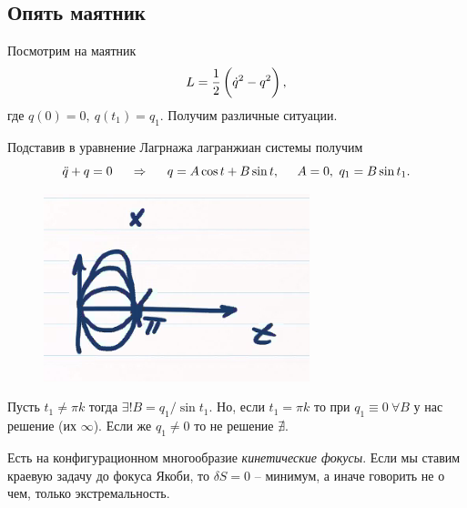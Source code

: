 \subsection{Опять маятник}



Посмотрим на маятник
\begin{equation*}
    L = \frac{1}{2} \left(\vphantom{\frac{1}{2}} \dot{q}^2 - q^2 \right),
\end{equation*}
где $q(0)=0, \ q(t_1)=q_1$. Получим различные ситуации. 

Подставив в уравнение Лагрнажа лагранжиан системы получим
\begin{equation*}
    \ddot{q} + q = 0
    \hspace{0.5cm} \Rightarrow \hspace{0.5cm} 
    q = A \cos t + B \sin t,
    \hspace{0.5cm} A = 0, \ q_1 = B \sin t_1.
\end{equation*}

\begin{figure}
  \begin{center}
        \vspace{-5 mm}
        \includegraphics[width=0.8\linewidth]{figures/1.png}
  \end{center}
\end{figure}


\noindent
Пусть $t_1 \neq \pi k $ тогда $\exists ! B = q_1 / \sin t_1$. Но, если $t_1 = \pi k$ то при $q_1 \equiv 0 \ \forall B$ у нас решение (их $\infty$). Если же $q_1 \neq 0$ то не решение $\nexists$. 


\begin{to_def} 
    Есть на конфигурационном многообразие \textit{кинетические фокусы}. Если мы ставим краевую задачу до фокуса Якоби, то $\delta S = 0$ -- минимум, а иначе говорить не о чем, только экстремальность.   
\end{to_def}


